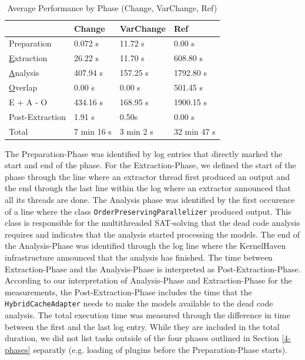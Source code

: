 \documentclass[a4paper]{article}
\begin{document}
\begin {table}[h]
\begin{center}
\caption {Average Performance by Phase (Change, VarChange, Ref)} \label{tab:performance} 
\begin{tabular}{|l | l | l | l|}
\hline
                               & Change                 & VarChange          & Ref  \\ \hline
	Preparation                & 0.072 s                & 11.72 s            & 0.00 s \\
	\underline{E}xtraction     & 26.22 s                & 11.70 s            & 608.80 s \\
	\underline{A}nalysis       & 407.94 s               & 157.25 s           & 1792.80 s \\
	\underline{O}verlap        & 0.00 s                 & 0.00 s             & 501.45 s \\
	E + A - O                  & 434.16 s               & 168.95 s           & 1900.15 s \\
	Post-Extraction             & 1.91 s                 & 0.50s              & 0.00 s \\ \hline
	Total                      & 7 min 16 s             & 3 min 2 s          & 32 min 47 s \\ \hline
\end{tabular}
\end{center}
\end{table}

The Preparation-Phase was identified by log entries that directly marked the start and end of the phase. For the Extraction-Phase, we defined the start of the phase through the line where an extractor thread first produced an output and the end through the last line within the log where an extractor announced that all its threads are done. The Analysis phase was identified by the first occurence of a line where the class \texttt{OrderPreservingParallelizer} produced output. This class is responsible for the multithreaded SAT-solving that the dead code analysis requires and indicates that the analysis started processing the models. The end of the Analysis-Phase was identified through the log line where the KernelHaven infrastructure announced that the analysis has finished. The time between Extraction-Phase and the Analysis-Phase is interpreted as Post-Extraction-Phase. According to our interpretation of Analysis-Phase and Extraction-Phase for the measurements, the Post-Extraction-Phase includes the time that the \texttt{Hybrid\-Cache\-Adapter} needs to make the models available to the dead code analysis. The total execution time was measured through the difference in time between the first and the last log entry. While they are included in the total duration, we did not list tasks outside of the four phases outlined in Section \ref{4-phases} separatly (e.g. loading of plugins before the Preparation-Phase starts).
\end{document}
